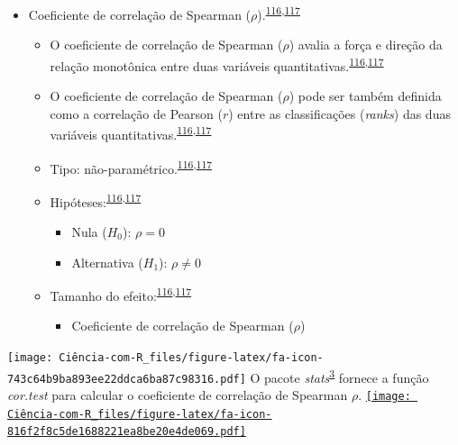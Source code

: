 \documentclass[
]{book}
\providecommand{\tightlist}{%
  \setlength{\itemsep}{0pt}\setlength{\parskip}{0pt}}
\begin{document}
\begin{itemize}
\item
  Coeficiente de correlação de Spearman (\(\rho\)).\textsuperscript{\protect\hyperlink{ref-khamis2008}{116},\protect\hyperlink{ref-allison2022}{117}}

  \begin{itemize}
  \item
    O coeficiente de correlação de Spearman (\(\rho\)) avalia a força e direção da relação monotônica entre duas variáveis quantitativas.\textsuperscript{\protect\hyperlink{ref-khamis2008}{116},\protect\hyperlink{ref-allison2022}{117}}
  \item
    O coeficiente de correlação de Spearman (\(\rho\)) pode ser também definida como a correlação de Pearson (\(r\)) entre as classificações (\emph{ranks}) das duas variáveis quantitativas.\textsuperscript{\protect\hyperlink{ref-khamis2008}{116},\protect\hyperlink{ref-allison2022}{117}}
  \item
    Tipo: não-paramétrico.\textsuperscript{\protect\hyperlink{ref-khamis2008}{116},\protect\hyperlink{ref-allison2022}{117}}
  \item
    Hipóteses:\textsuperscript{\protect\hyperlink{ref-khamis2008}{116},\protect\hyperlink{ref-allison2022}{117}}

    \begin{itemize}
    \item
      Nula (\(H_{0}\)): \(\rho=0\)
    \item
      Alternativa (\(H_{1}\)): \(\rho≠0\)
    \end{itemize}
  \item
    Tamanho do efeito:\textsuperscript{\protect\hyperlink{ref-khamis2008}{116},\protect\hyperlink{ref-allison2022}{117}}

    \begin{itemize}
    \tightlist
    \item
      Coeficiente de correlação de Spearman (\(\rho\))
    \end{itemize}
  \end{itemize}
\end{itemize}

\texttt{[image: Ciência-com-R\_files/figure-latex/fa-icon-743c64b9ba893ee22ddca6ba87c98316.pdf]} O pacote \emph{stats}\textsuperscript{\protect\hyperlink{ref-stats-2}{3}} fornece a função \emph{cor.test} para calcular o coeficiente de correlação de Spearman \(\rho\). \href{https://rdocumentation.org/packages/stats/versions/3.6.2}{\texttt{[image: Ciência-com-R\_files/figure-latex/fa-icon-816f2f8c5de1688221ea8be20e4de069.pdf]}}
\end{document}
